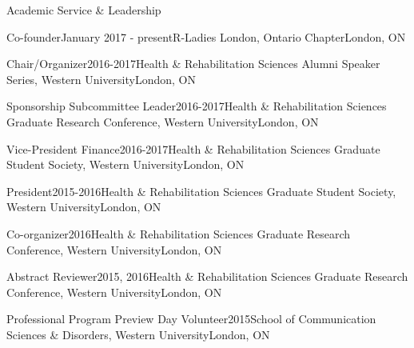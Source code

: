 \documentclass{resume} %
\begin{document}
\begin{rSection}{Academic Service \& Leadership}

	\begin{rSubsection}{Co-founder}{January 2017 - present}{R-Ladies London, Ontario Chapter}{London, ON}
	\end{rSubsection}
	
	\begin{rSubsection}{Chair/Organizer}{2016-2017}{Health \& Rehabilitation Sciences Alumni Speaker Series, Western University}{London, ON}
	\end{rSubsection}
	
	\begin{rSubsection}{Sponsorship Subcommittee Leader}{2016-2017}{Health \& Rehabilitation Sciences Graduate Research Conference, Western University}{London, ON}
	\end{rSubsection}
	
	\begin{rSubsection}{Vice-President Finance}{2016-2017}{Health \& Rehabilitation Sciences Graduate Student Society, Western University}{London, ON}
	\end{rSubsection}
	
	\begin{rSubsection}{President}{2015-2016}{Health \& Rehabilitation Sciences Graduate Student Society, Western University}{London, ON}
	\end{rSubsection}
	
	\begin{rSubsection}{Co-organizer}{2016}{Health \& Rehabilitation Sciences Graduate Research Conference, Western University}{London, ON}
	\end{rSubsection}
	
	\begin{rSubsection}{Abstract Reviewer}{2015, 2016}{Health \& Rehabilitation Sciences Graduate Research Conference, Western University}{London, ON}
	\end{rSubsection}
	
	\begin{rSubsection}{Professional Program Preview Day Volunteer}{2015}{School of Communication Sciences \& Disorders, Western University}{London, ON}
	\end{rSubsection}


\end{rSection}

\end{document}
